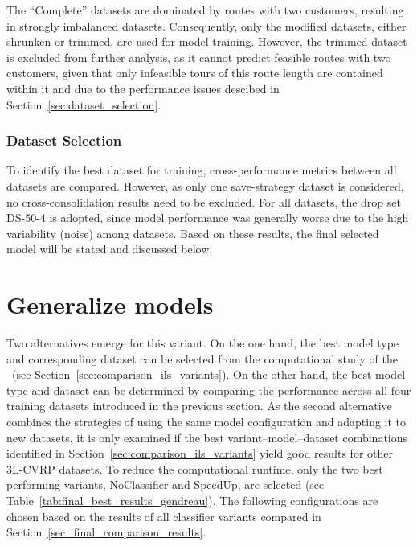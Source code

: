 The “Complete” datasets are dominated by routes with two customers, resulting in strongly imbalanced datasets. Consequently,
only the modified datasets, either shrunken or trimmed, are used for model training. However, the trimmed dataset is excluded
from further analysis, as it cannot predict feasible routes with two customers, given that only infeasible tours of this route
length are contained within it and due to the performance issues descibed in Section~\ref{sec:dataset_selection}.

\subsubsection{Dataset Selection}

To identify the best dataset for training, cross-performance metrics between all datasets are compared. However,
as only one save-strategy dataset is considered, no cross-consolidation results need to be excluded. For all datasets,
the drop set DS-50-4 is adopted, since model performance was generally worse due to the high variability (noise) among datasets.
\parbreak
Based on these results, the final selected model will be stated and discussed below.

\section{Generalize \gendreauDataSetText models}
\label{sec:krebs_data_pretrained_models}

Two alternatives emerge for this variant. On the one hand, the best model type and corresponding dataset can be selected
from the computational study of the \gendreauDataSetText~(see Section~\ref{sec:comparison_ils_variants}). On the other hand, the
best model type and dataset can be determined by comparing the performance across all four \krebsADataSetText training datasets introduced in the previous section.
As the second alternative combines the strategies of using the same model configuration and adapting it to new datasets, it is
only examined if the best variant–model–dataset combinations identified in Section~\ref{sec:comparison_ils_variants} yield good
results for other \gls{3L-CVRP} datasets. To reduce the computational runtime, only the two best performing variants, NoClassifier
and SpeedUp, are selected (see Table~\ref{tab:final_best_results_gendreau}). The following configurations are chosen based
on the results of all classifier variants compared in Section~\ref{sec_final_comparison_results}.

